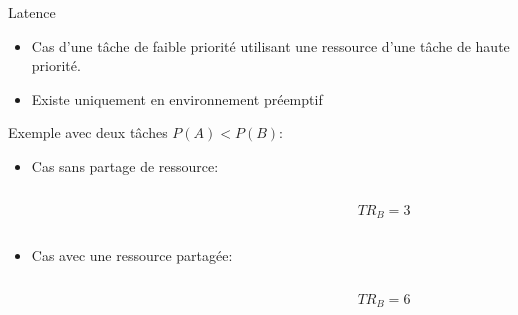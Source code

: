 \begin{frame}{Latence}
  \begin{itemize} 
  \item  Cas d'une tâche  de faible  priorité utilisant  une ressource
    d'une tâche de haute priorité.
  \item Existe uniquement en environnement préemptif
  \end{itemize} 
  Exemple avec deux tâches $P(A) < P(B)$:
  \begin{itemize} 
  \item Cas sans partage de ressource:
  \begin{columns}
    \begin{column}{6cm}
    \begin{center}
   \end{center}
 \end{column}
   \begin{column}{4cm}
 $$TR_B = 3$$
\end{column}
\end{columns}
  \item Cas avec une ressource partagée:
  \begin{columns}
    \begin{column}{6cm}
    \begin{center}
   \end{center}
 \end{column}
   \begin{column}{4cm}
      $$TR_B = 6$$
    \end{column}
  \end{columns}
\end{itemize}     
\end{frame} 


